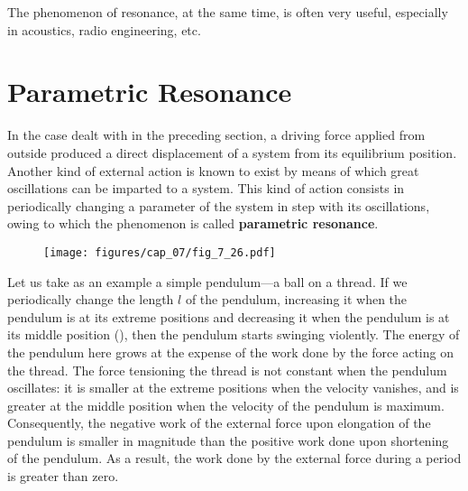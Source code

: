 The phenomenon of resonance, at the same time, is often very useful, especially in acoustics, radio engineering, etc.

\section{Parametric Resonance}\label{sec:7_13}

In the case dealt with in the preceding section, a driving force applied from outside produced a direct displacement of a system from its equilibrium position. Another kind of external action is known to exist by means of which great oscillations can be imparted to a system. This kind of action consists in periodically changing a parameter of the system in step with its oscillations, owing to which the phenomenon is called \textbf{parametric resonance}.

\begin{figure}[t]
	\begin{center}
		\texttt{[image: figures/cap\_07/fig\_7\_26.pdf]}
		\caption[]{}
		\label{fig:7_26}
	\end{center}
	\vspace{-0.8cm}
\end{figure}

Let us take as an example a simple pendulum---a ball on a thread. If we periodically change the length $l$ of the pendulum, increasing it when the pendulum is at its extreme positions and decreasing it when the pendulum is at its middle position (), then the pendulum starts swinging violently. The energy of the pendulum here grows at the expense of the work done by the force acting on the thread. The force tensioning the thread is not constant when the pendulum oscillates: it is smaller at the extreme positions when the velocity vanishes, and is greater at the middle position when the velocity of the pendulum is maximum. Consequently, the negative work of the external force upon elongation of the pendulum is smaller in magnitude than the positive work done upon shortening of the pendulum. As a result, the work done by the external force during a period is greater than zero.

